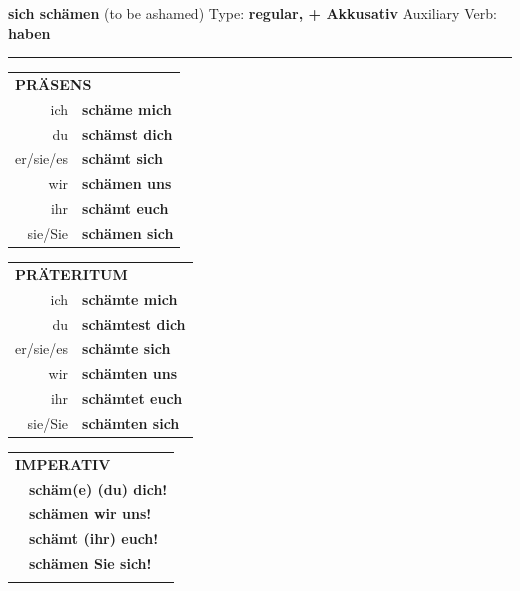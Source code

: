 \documentclass[10pt,a4paper]{revtex4-2}
\begin{document}
\begin{verbbox-acc}
        {\Large \bf sich schämen} (to be ashamed) \hfill Type: \textbf{regular, + Akkusativ} \hfill Auxiliary Verb: \textbf{haben} 
    
       \vspace{5pt}

    \hrule
    
    \vspace{5pt}

  \begin{tabular}{rl}
     \multicolumn{2}{l}{\textbf{PRÄSENS} }\\
    ich & \textbf{schäme mich}\\
    du & \textbf{schämst dich}\\
    er/sie/es & \textbf{schämt sich}\\
    wir & \textbf{schämen uns}\\
    ihr & \textbf{schämt euch}\\
    sie/Sie & \textbf{schämen sich}\\
  \end{tabular}
  \hfill
     \begin{tabular}{rl}
    \multicolumn{2}{l}{\textbf{PRÄTERITUM} }\\
    ich & \textbf{schämte mich}\\
    du & \textbf{schämtest dich}\\
    er/sie/es & \textbf{schämte sich}\\
    wir & \textbf{schämten uns}\\
    ihr & \textbf{schämtet euch}\\
    sie/Sie & \textbf{schämten sich}\\
  \end{tabular}
  \hfill
  \begin{tabular}{rl}
     \multicolumn{2}{l}{\textbf{IMPERATIV} }\\
   & \textbf{schäm(e) (du) dich!}\\
   & \textbf{schämen wir uns!}\\
   & \textbf{schämt (ihr) euch!}\\
   & \textbf{schämen Sie sich!}\\
   & \vspace{10pt}
  \end{tabular}

    \vspace{10pt}


\end{verbbox-acc}
\end{document}
